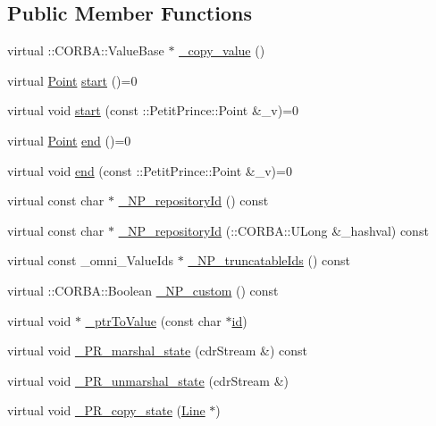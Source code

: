 \subsection*{Public Member Functions}
\begin{DoxyCompactItemize}
\item 
virtual \+::C\+O\+R\+B\+A\+::\+Value\+Base $\ast$ \hyperlink{class_line_a1394704db9b14feb758131900ad5d173}{\+\_\+copy\+\_\+value} ()
\item 
virtual \hyperlink{struct_point}{Point} \hyperlink{class_line_aaf3b5135f7b80df4a4882277a5b1b63f}{start} ()=0
\item 
virtual void \hyperlink{class_line_aa0fb946ffb5689f0eb08339a93ea76ed}{start} (const \+::Petit\+Prince\+::\+Point \&\+\_\+v)=0
\item 
virtual \hyperlink{struct_point}{Point} \hyperlink{class_line_ad69f4951e34588087edacf3dccb9205f}{end} ()=0
\item 
virtual void \hyperlink{class_line_a422da36ea2f877b1c30d0bff5153a707}{end} (const \+::Petit\+Prince\+::\+Point \&\+\_\+v)=0
\item 
virtual const char $\ast$ \hyperlink{class_line_a5aa5a1667a431543c7d5f5c5aa392962}{\+\_\+\+N\+P\+\_\+repository\+Id} () const 
\item 
virtual const char $\ast$ \hyperlink{class_line_a12ea7527d761f37cfe908fbcabab7ca7}{\+\_\+\+N\+P\+\_\+repository\+Id} (\+::C\+O\+R\+B\+A\+::\+U\+Long \&\+\_\+hashval) const 
\item 
virtual const \+\_\+omni\+\_\+\+Value\+Ids $\ast$ \hyperlink{class_line_a35a312efa270e82c4c038e90aa6e676e}{\+\_\+\+N\+P\+\_\+truncatable\+Ids} () const 
\item 
virtual \+::C\+O\+R\+B\+A\+::\+Boolean \hyperlink{class_line_a694798a7c10a1140fe76cfd7c5563594}{\+\_\+\+N\+P\+\_\+custom} () const 
\item 
virtual void $\ast$ \hyperlink{class_line_a569c01e17ca50a4b7d6bd7d80553040d}{\+\_\+ptr\+To\+Value} (const char $\ast$\hyperlink{class_draw_a50509da989141b00a5ae22d68a4d5856}{id})
\item 
virtual void \hyperlink{class_line_a17a35e84f5dd3ff6ecfa3df14f02dc10}{\+\_\+\+P\+R\+\_\+marshal\+\_\+state} (cdr\+Stream \&) const 
\item 
virtual void \hyperlink{class_line_a001d93972f80167f1b53d728a55afef9}{\+\_\+\+P\+R\+\_\+unmarshal\+\_\+state} (cdr\+Stream \&)
\item 
virtual void \hyperlink{class_line_a1b19ca8c4ce07cd365d189215f12c62f}{\+\_\+\+P\+R\+\_\+copy\+\_\+state} (\hyperlink{class_line}{Line} $\ast$)
\end{DoxyCompactItemize}
